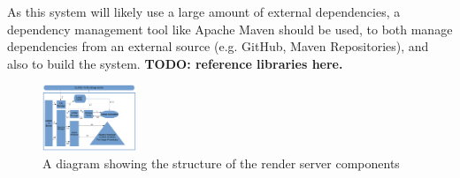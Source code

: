 \documentclass[12pt,a4paper]{article}
\begin{document}
As this system will likely use a large amount of external dependencies, a dependency management tool
like Apache Maven should be used, to both manage dependencies from an external source (e.g. GitHub, Maven
Repositories), and also to build the system.
\textbf{TODO: reference libraries here.}

\begin{figure}[h]
    \centering
    \includegraphics[width=0.25\textwidth]{renderserverdiagram}
    \caption{A diagram showing the structure of the render server components}
    \label{RenderServerDiagram}
\end{figure}
\end{document}
